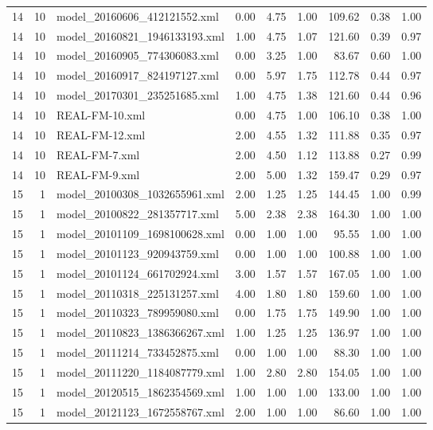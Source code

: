\begin{table}[ht]
\begin{tabular}{rrlrrrrrr}
   14 &  10 & model\_20160606\_412121552.xml & 0.00 & 4.75 & 1.00 & 109.62 & 0.38 & 1.00 \\ 
   14 &  10 & model\_20160821\_1946133193.xml & 1.00 & 4.75 & 1.07 & 121.60 & 0.39 & 0.97 \\ 
   14 &  10 & model\_20160905\_774306083.xml & 0.00 & 3.25 & 1.00 & 83.67 & 0.60 & 1.00 \\ 
   14 &  10 & model\_20160917\_824197127.xml & 0.00 & 5.97 & 1.75 & 112.78 & 0.44 & 0.97 \\ 
   14 &  10 & model\_20170301\_235251685.xml & 1.00 & 4.75 & 1.38 & 121.60 & 0.44 & 0.96 \\ 
   14 &  10 & REAL-FM-10.xml & 0.00 & 4.75 & 1.00 & 106.10 & 0.38 & 1.00 \\ 
   14 &  10 & REAL-FM-12.xml & 2.00 & 4.55 & 1.32 & 111.88 & 0.35 & 0.97 \\ 
   14 &  10 & REAL-FM-7.xml & 2.00 & 4.50 & 1.12 & 113.88 & 0.27 & 0.99 \\ 
   14 &  10 & REAL-FM-9.xml & 2.00 & 5.00 & 1.32 & 159.47 & 0.29 & 0.97 \\ 
   15 &   1 & model\_20100308\_1032655961.xml & 2.00 & 1.25 & 1.25 & 144.45 & 1.00 & 0.99 \\ 
   15 &   1 & model\_20100822\_281357717.xml & 5.00 & 2.38 & 2.38 & 164.30 & 1.00 & 1.00 \\ 
   15 &   1 & model\_20101109\_1698100628.xml & 0.00 & 1.00 & 1.00 & 95.55 & 1.00 & 1.00 \\ 
   15 &   1 & model\_20101123\_920943759.xml & 0.00 & 1.00 & 1.00 & 100.88 & 1.00 & 1.00 \\ 
   15 &   1 & model\_20101124\_661702924.xml & 3.00 & 1.57 & 1.57 & 167.05 & 1.00 & 1.00 \\ 
   15 &   1 & model\_20110318\_225131257.xml & 4.00 & 1.80 & 1.80 & 159.60 & 1.00 & 1.00 \\ 
   15 &   1 & model\_20110323\_789959080.xml & 0.00 & 1.75 & 1.75 & 149.90 & 1.00 & 1.00 \\ 
   15 &   1 & model\_20110823\_1386366267.xml & 1.00 & 1.25 & 1.25 & 136.97 & 1.00 & 1.00 \\ 
   15 &   1 & model\_20111214\_733452875.xml & 0.00 & 1.00 & 1.00 & 88.30 & 1.00 & 1.00 \\ 
   15 &   1 & model\_20111220\_1184087779.xml & 1.00 & 2.80 & 2.80 & 154.05 & 1.00 & 1.00 \\ 
   15 &   1 & model\_20120515\_1862354569.xml & 1.00 & 1.00 & 1.00 & 133.00 & 1.00 & 1.00 \\ 
   15 &   1 & model\_20121123\_1672558767.xml & 2.00 & 1.00 & 1.00 & 86.60 & 1.00 & 1.00 \\ 

\end{tabular}
\end{table}
